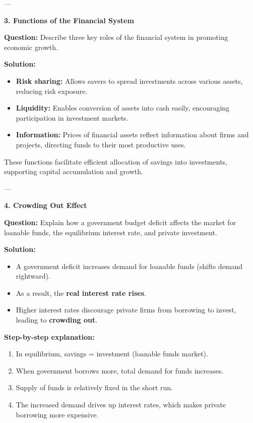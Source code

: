 \documentclass[12pt]{article}
\begin{document}
---

\textbf{3. Functions of the Financial System}

\textbf{Question:}  
Describe three key roles of the financial system in promoting economic growth.

\textbf{Solution:}  
\begin{itemize}
    \item \textbf{Risk sharing:} Allows savers to spread investments across various assets, reducing risk exposure.
    \item \textbf{Liquidity:} Enables conversion of assets into cash easily, encouraging participation in investment markets.
    \item \textbf{Information:} Prices of financial assets reflect information about firms and projects, directing funds to their most productive uses.
\end{itemize}
These functions facilitate efficient allocation of savings into investments, supporting capital accumulation and growth.

---

\textbf{4. Crowding Out Effect}

\textbf{Question:}  
Explain how a government budget deficit affects the market for loanable funds, the equilibrium interest rate, and private investment.

\textbf{Solution:}  
\begin{itemize}
    \item A government deficit increases demand for loanable funds (shifts demand rightward).
    \item As a result, the \textbf{real interest rate rises}.
    \item Higher interest rates discourage private firms from borrowing to invest, leading to \textbf{crowding out}.
\end{itemize}

\textbf{Step-by-step explanation:}
\begin{enumerate}
    \item In equilibrium, savings = investment (loanable funds market).
    \item When government borrows more, total demand for funds increases.
    \item Supply of funds is relatively fixed in the short run.
    \item The increased demand drives up interest rates, which makes private borrowing more expensive.
\end{enumerate}
\end{document}
